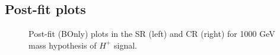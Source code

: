 \subsection{Post-fit plots}
\begin{figure}[H]
  \centering
  \caption{Post-fit (BOnly) plots in the SR (left) and CR (right) for 1000 GeV mass hypothesis of $H^{+}$ signal.}
  \label{fig:Postfit_Hp1000_Blind}
\end{figure}
